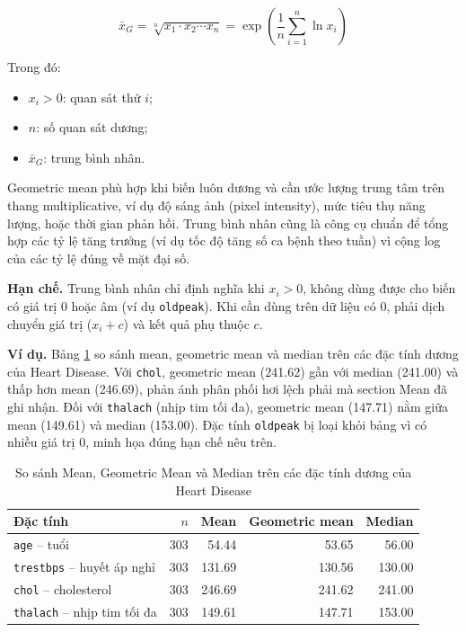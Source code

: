 \begin{equation}
\bar{x}_G = \sqrt[n]{x_1 \cdot x_2 \cdots x_n} = \exp\!\left(\frac{1}{n}\sum_{i=1}^{n}\ln x_i\right)
\end{equation}

Trong đó:
\begin{itemize}[leftmargin=1.6em,label=\textbullet]
 \item $x_i > 0$: quan sát thứ $i$;
 \item $n$: số quan sát dương;
 \item $\bar{x}_G$: trung bình nhân.
\end{itemize}

Geometric mean phù hợp khi biến luôn dương và cần ước lượng trung tâm trên thang multiplicative, ví dụ độ sáng ảnh (pixel intensity), mức tiêu thụ năng lượng, hoặc thời gian phản hồi. Trung bình nhân cũng là công cụ chuẩn để tổng hợp các tỷ lệ tăng trưởng (ví dụ tốc độ tăng số ca bệnh theo tuần) vì cộng log của các tỷ lệ đúng về mặt đại số.

\textbf{Hạn chế.} Trung bình nhân chỉ định nghĩa khi $x_i > 0$, không dùng được cho biến có giá trị 0 hoặc âm (ví dụ \texttt{oldpeak}). Khi cần dùng trên dữ liệu có 0, phải dịch chuyển giá trị ($x_i + c$) và kết quả phụ thuộc $c$.

\textbf{Ví dụ.} Bảng \ref{tab:chapter1_geom_example} so sánh mean, geometric mean và median trên các đặc tính dương của Heart Disease. Với \texttt{chol}, geometric mean (241.62) gần với median (241.00) và thấp hơn mean (246.69), phản ánh phân phối hơi lệch phải mà section Mean đã ghi nhận. Đối với \texttt{thalach} (nhịp tim tối đa), geometric mean (147.71) nằm giữa mean (149.61) và median (153.00). Đặc tính \texttt{oldpeak} bị loại khỏi bảng vì có nhiều giá trị 0, minh họa đúng hạn chế nêu trên.

\begin{table}[H]
\centering
\caption{So sánh Mean, Geometric Mean và Median trên các đặc tính dương của Heart Disease}
\label{tab:chapter1_geom_example}
\small
\begin{tabular}{lrrrr}
\toprule
Đặc tính & $n$ & Mean & Geometric mean & Median \\
\midrule
\texttt{age} -- tuổi & 303 & 54.44 & 53.65 & 56.00 \\
\texttt{trestbps} -- huyết áp nghỉ & 303 & 131.69 & 130.56 & 130.00 \\
\texttt{chol} -- cholesterol & 303 & 246.69 & 241.62 & 241.00 \\
\texttt{thalach} -- nhịp tim tối đa & 303 & 149.61 & 147.71 & 153.00 \\
\bottomrule
\end{tabular}
\end{table}

